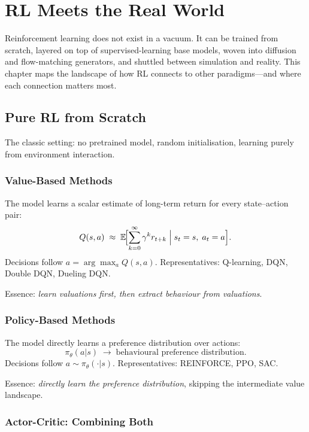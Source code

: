 \chapter{RL Meets the Real World}
\label{ch:rl-real-world}

Reinforcement learning does not exist in a vacuum.
It can be trained from scratch, layered on top of supervised-learning base models, woven into diffusion and flow-matching generators, and shuttled between simulation and reality.
This chapter maps the landscape of how RL connects to other paradigms---and where each connection matters most.

\section{Pure RL from Scratch}
\label{sec:pure-rl}

The classic setting: no pretrained model, random initialisation, learning purely from environment interaction.

\subsection{Value-Based Methods}

The model learns a scalar estimate of long-term return for every state--action pair:
\[
  Q(s,a) \;\approx\; \mathbb{E}\!\Bigl[\sum_{k=0}^{\infty}\gamma^k r_{t+k} \;\Big|\; s_t=s,\;a_t=a\Bigr].
\]
Decisions follow $a = \arg\max_a Q(s,a)$.
Representatives: Q-learning, DQN, Double DQN, Dueling DQN.

Essence: \emph{learn valuations first, then extract behaviour from valuations}.

\subsection{Policy-Based Methods}

The model directly learns a preference distribution over actions:
\[
  \pi_\theta(a|s) \;\to\; \text{behavioural preference distribution}.
\]
Decisions follow $a \sim \pi_\theta(\cdot|s)$.
Representatives: REINFORCE, PPO, SAC.

Essence: \emph{directly learn the preference distribution}, skipping the intermediate value landscape.

\subsection{Actor-Critic: Combining Both}

